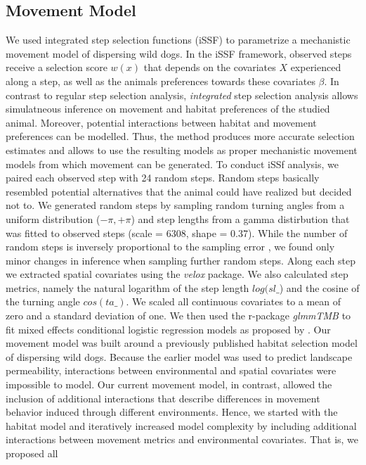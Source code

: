 \documentclass[abstract=on,10pt,a4paper,bibliography=totocnumbered]{article}
\begin{document}
\subsection{Movement Model}
We used integrated step selection functions (iSSF) to parametrize a mechanistic
movement model of dispersing wild dogs. In the iSSF framework, observed steps
receive a selection score \(w(x)\) that depends on the covariates \(X\)
experienced along a step, as well as the animals preferences towards these
covariates \(\beta\). In contrast to regular step selection analysis,
\textit{integrated} step selection analysis allows simulatneous inference on
movement and habitat preferences of the studied animal. Moreover, potential
interactions between habitat and movement preferences can be modelled. Thus, the
method produces more accurate selection estimates and allows to use the
resulting models as proper mechanistic movement models from which movement can
be generated. To conduct iSSf analysis, we paired each observed step with 24
random steps. Random steps basically resembled potential alternatives that the
animal could have realized but decided not to. We generated random steps by
sampling random turning angles from a uniform distribution (\(-\pi, +\pi\)) and
step lengths from a gamma distirbution that was fitted to observed steps (scale
= 6308, shape = 0.37). While the number of random steps is inversely
proportional to the sampling error \citep{Avgar.2016}, we found only minor
changes in inference when sampling further random steps. Along each step we
extracted spatial covariates using the \textit{velox} package. We also
calculated step metrics, namely the natural logarithm of the step length
\(log(sl\_\)) and the cosine of the turning angle \(cos(ta\_)\). We scaled all
continuous covariates to a mean of zero and a standard deviation of one. We then
used the r-package \textit{glmmTMB} to fit mixed effects conditional logistic
regression models as proposed by \citep{Muff.2020}. Our movement model was built
around a previously published habitat selection model of dispersing wild dogs.
Because the earlier model was used to predict landscape permeability,
interactions between environmental and spatial covariates were impossible to
model. Our current movement model, in contrast, allowed the inclusion of
additional interactions that describe differences in movement behavior induced
through different environments. Hence, we started with the habitat model and
iteratively increased model complexity by including additional interactions
between movement metrics and environmental covariates. That is, we proposed all
\end{document}
